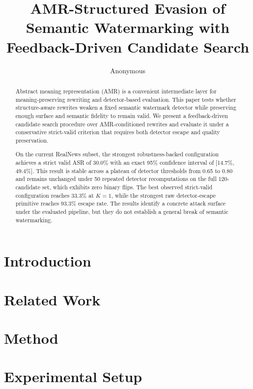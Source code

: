 \documentclass[11pt]{article}
\title{AMR-Structured Evasion of Semantic Watermarking with Feedback-Driven Candidate Search}
\author{Anonymous}
\date{}
\begin{document}
\maketitle

\begin{abstract}
Abstract meaning representation (AMR) is a convenient intermediate layer for meaning-preserving rewriting and detector-based evaluation. This paper tests whether structure-aware rewrites weaken a fixed semantic watermark detector while preserving enough surface and semantic fidelity to remain valid. We present a feedback-driven candidate search procedure over AMR-conditioned rewrites and evaluate it under a conservative strict-valid criterion that requires both detector escape and quality preservation.

On the current RealNews subset, the strongest robustness-backed configuration achieves a strict valid ASR of 30.0\% with an exact 95\% confidence interval of [14.7\%, 49.4\%]. This result is stable across a plateau of detector thresholds from 0.65 to 0.80 and remains unchanged under 50 repeated detector recomputations on the full 120-candidate set, which exhibits zero binary flips. The best observed strict-valid configuration reaches 33.3\% at $K=1$, while the strongest raw detector-escape primitive reaches 93.3\% escape rate. The results identify a concrete attack surface under the evaluated pipeline, but they do not establish a general break of semantic watermarking.
\end{abstract}

\section{Introduction}


\section{Related Work}


\section{Method}


\section{Experimental Setup}

\end{document}
